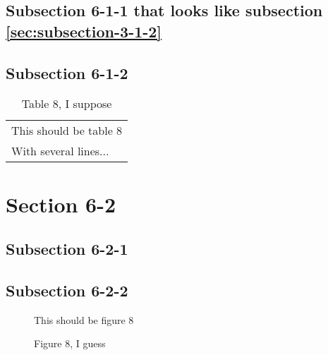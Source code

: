 \documentclass[10pt]{article}
\begin{document}
\subsection{Subsection 6-1-1 that looks like subsection \ref{sec:subsection-3-1-2}}
\label{sec:subsection-6-1-1}

\subsection{Subsection 6-1-2}
\label{sec:subsection-6-1-2}

\begin{table}
  \centering
  \begin{tabular}{l}
    This should be table 8\\
    With several lines...
  \end{tabular}
  \caption{Table 8, I suppose}
  \label{tab:table-8}
\end{table}


\section{Section 6-2}
\label{sec:section-6-2}
\secttoc
\sectlot
\sectlof

\subsection{Subsection 6-2-1}
\label{sec:subsection-6-2-1}

\subsection{Subsection 6-2-2}
\label{sec:subsection-6-2-2}

\begin{figure}
  \centering
  This should be figure 8
  \caption{Figure 8, I guess}
  \label{fig:figure-8}
\end{figure}
\end{document}
